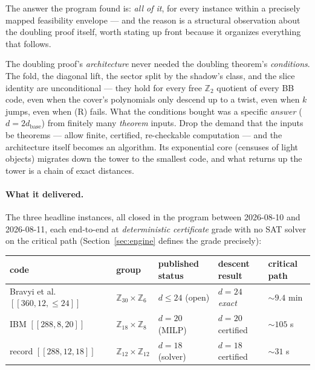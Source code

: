 \documentclass[11pt]{article}
\theoremstyle{plain}
\theoremstyle{definition}
\theoremstyle{remark}
\newcommand{\Z}{\mathbb{Z}}
\newcommand{\base}{\mathrm{base}}
\begin{document}
The answer the program found is: \emph{all of it}, for every instance
within a precisely mapped feasibility envelope --- and the reason is a
structural observation about the doubling proof itself, worth stating up
front because it organizes everything that follows.

\begin{keyidea}
The doubling proof's \emph{architecture} never needed the doubling
theorem's \emph{conditions}. The fold, the diagonal lift, the sector split
by the shadow's class, and the slice identity are unconditional --- they
hold for every free $\Z_2$ quotient of every BB code, even when the cover's
polynomials only descend up to a twist, even when $k$ jumps, even when
(R) fails. What the conditions bought was a specific \emph{answer}
($d = 2d_{\base}$) from finitely many \emph{theorem} inputs. Drop the
demand that the inputs be theorems --- allow finite, certified,
re-checkable computation --- and the architecture itself becomes an
algorithm. Its exponential core (censuses of light objects) migrates down
the tower to the smallest code, and what returns up the tower is a chain
of exact distances.
\end{keyidea}

\paragraph{What it delivered.}
The three headline instances, all closed in the program between
2026-08-10 and 2026-08-11, each end-to-end at \emph{deterministic
certificate} grade with no SAT solver on the critical path
(Section~\ref{sec:engine} defines the grade precisely):

\begin{center}
\small
\begin{tabular}{lllll}
\toprule
code & group & published status & descent result & critical path\\
\midrule
Bravyi et al.\ $[[360,12,\leq 24]]$ & $\Z_{30}{\times}\Z_6$ &
$d \leq 24$ (open) & $d = 24$ \emph{exact} & ${\sim}9.4$ min\\
IBM $[[288,8,20]]$ & $\Z_{18}{\times}\Z_8$ &
$d = 20$ (MILP) & $d = 20$ certified & ${\sim}105$ s\\
record $[[288,12,18]]$ & $\Z_{12}{\times}\Z_{12}$ &
$d = 18$ (solver) & $d = 18$ certified & ${\sim}31$ s\\
\bottomrule
\end{tabular}
\end{center}
\end{document}
